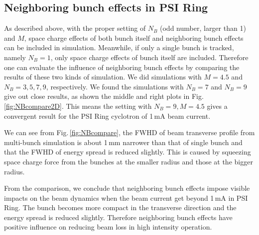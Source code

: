 \documentclass{JAC2003}
\begin{document}
\subsection {Neighboring bunch effects in PSI Ring}

As described above, with the proper setting of $N_B$ (odd number, larger than 1) and $M$, 
space charge effects of both bunch itself and neighboring bunch effects can be included in \opalcycl simulation. 
Meanwhile, if only a single bunch is tracked, namely $N_B=1$, only space charge effects of bunch itself are included. 
Therefore one can evaluate the influence of neighboring bunch effects by comparing the results of these two kinds of simulation.
We did simulations with $M=4.5$ and $N_B=3, 5, 7, 9$, respectively. We found the simulations with $N_B=7$ and $N_B=9$ give out close results,
as shown the middle and right plots in Fig.\,\ref{fig:NBcompare2D}. 
This means the setting with $N_B=9, M=4.5$ gives a convergent result for the PSI Ring cyclotron of 1\,mA beam current.

We can see from Fig.\,\ref{fig:NBcompare}, the FWHD of beam transverse profile from multi-bunch simulation is about 1\,mm narrower than that of single bunch and that the FWHD of energy spread is reduced slightly. This is caused by squeezing space charge force from the bunches at the smaller radius 
and those at the bigger radius. 

From the comparison, we conclude that neighboring bunch effects impose visible impacts on the beam dynamics when the beam current get beyond 1\,mA in PSI Ring. 
The bunch becomes more compact in the transverse direction and the energy spread is reduced slightly. Therefore neighboring bunch effects have positive influence
on reducing beam loss in high intensity operation.
\end{document}
